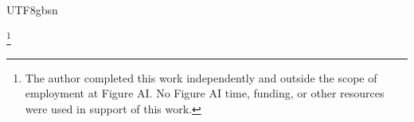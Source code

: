 \ifTablambdaChinese
\begin{CJK*}{UTF8}{gbsn}
  \renewcommand{\proofname}{证明}
  \makeatletter
  \newcommand{\tablambdaThmName}[1]{\@ifundefined{tablambda@thm@#1}{#1}{\csname tablambda@thm@#1\endcsname}}
  \renewcommand{\thmname}[1]{\tablambdaThmName{#1}}
  \makeatother
  \fi

  \title[Cyclic Graphs and Memoization in Pure $\lambda$-Calculus]{}
  \ifTablambdaBody\else
  \subtitle{Supplementary Material}
  \fi

  \author{Bo Yang}
  \thanks{The author completed this work independently and outside the scope of employment at Figure AI. No Figure AI time, funding, or other resources were used in support of this work.}


\end{CJK*}

